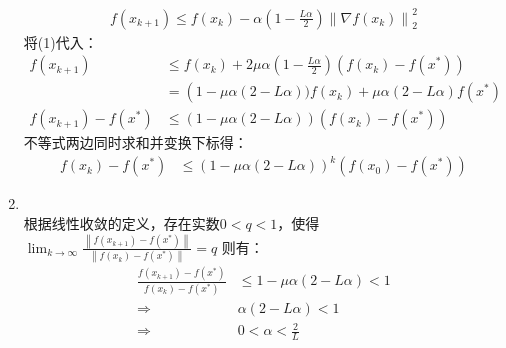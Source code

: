 \documentclass[11pt,letter,notitlepage]{article}
\begin{document}
\begin{solution}
\begin{enumerate}
\begin{align*}
            f\left(x_{k+1}\right) \leqslant f\left(x_{k}\right)-\alpha\left(1-\frac{L \alpha}{2}\right)\left\|\nabla f\left(x_{k}\right)\right\|_{2}^{2}
        \end{align*}
        将(1)代入：
        \begin{align*}
           f(x_{k+1}) & \leqslant f\left(x_{k}\right)+2 \mu \alpha \left(1-\frac{L \alpha}{2}\right)\left(f\left(x_{k}\right)-f\left(x^{*}\right)\right) \\ &=\left(1-\mu \alpha (2-L \alpha )) f\left(x_{k}\right)+\mu \alpha (2-L \alpha) f\left(x^{*}\right)\right.\\
           f\left(x_{k+1}\right)-f\left(x^{*}\right) & \leqslant\left(1-\mu \alpha(2-L \alpha )\right)\left(f\left(x_{k}\right)-f\left(x^{*}\right)\right)
        \end{align*}
        不等式两边同时求和并变换下标得：
        \begin{align*}
            f\left(x_{k}\right)-f\left(x^{*}\right) & \leqslant(1-\mu \alpha(2-L\alpha ))^{k}\left(f\left(x_{0}\right)-f\left(x^{*}\right)\right)
        \end{align*}
        \item \ \\
        根据线性收敛的定义，存在实数$0 < q < 1$，使得$\lim _{k \rightarrow \infty} \frac{\left\|f(x_{k+1})-f(x^{*})\right\|}{\left\|f(x_{k})-f(x^{*})\right\|}=q$ 则有：\\
        \begin{align*} 
            \frac{f\left(x_{k+1}\right)-f\left(x^{*}\right)}{f\left(x_{k}\right)-f\left(x^{*}\right)} &\leqslant 1-\mu \alpha(2-L \alpha) < 1 \\ \Rightarrow & \alpha(2-L \alpha) < 1 \\ \Rightarrow & 0<\alpha<\frac{2}{L}
        \end{align*}
    \end{enumerate}

\end{solution}
\newpage
\end{document}
